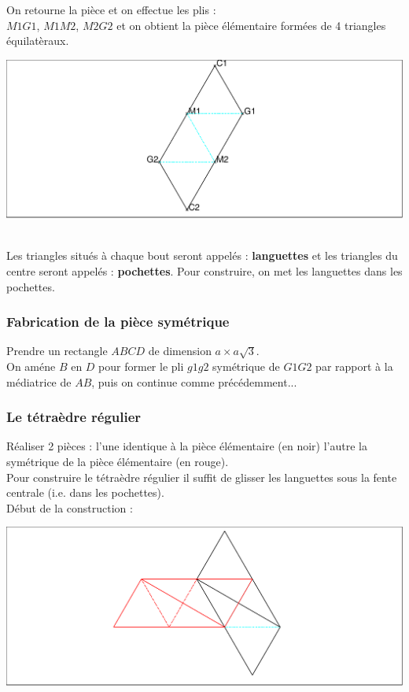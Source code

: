 \documentclass[a4paper,11pt]{book}
\begin{document}
\noindent
\begin{minipage}[h]{7cm}
On retourne la pi\`ece et on effectue les plis :\\
$M1G1$, $M1M2$, $M2G2$ et on obtient la pi\`ece \'el\'ementaire form\'ees de 
4 triangles \'equilat\`eraux.
\end{minipage}
\hspace{0.5cm}
\begin{minipage}[h]{7cm}
\includegraphics[width=\textwidth]{pli5}
\end{minipage}
\ \\
Les triangles situ\'es \`a chaque bout seront appel\'es : {\bf languettes} et
les triangles du centre seront appel\'es : {\bf pochettes}.
Pour construire, on  met les languettes dans les pochettes.
\subsubsection{Fabrication de la pi\`ece sym\'etrique}
Prendre un rectangle $ABCD$ de dimension $a\times a\sqrt 3$.\\
On am\'ene $B$ en $D$ pour former le pli $g1g2$ sym\'etrique de $G1G2$ par 
rapport \`a la m\'ediatrice de $AB$, puis on continue comme 
pr\'ec\'edemment...
\subsubsection{Le t\'etra\`edre r\'egulier} 
\noindent
\begin{minipage}[h]{7cm}
R\'ealiser 2 pi\`eces : l'une identique \`a la pi\`ece \'el\'ementaire (en noir)
l'autre la sym\'etrique de la pi\`ece \'el\'ementaire (en rouge).\\
Pour construire le t\'etra\`edre r\'egulier il suffit de glisser les languettes sous la fente centrale (i.e. dans les pochettes).\\
D\'ebut de la construction :\\
\end{minipage}
\hspace{0.5cm}
\begin{minipage}[h]{7cm}
\includegraphics[width=\textwidth]{pli6}
\end{minipage}
\end{document}
